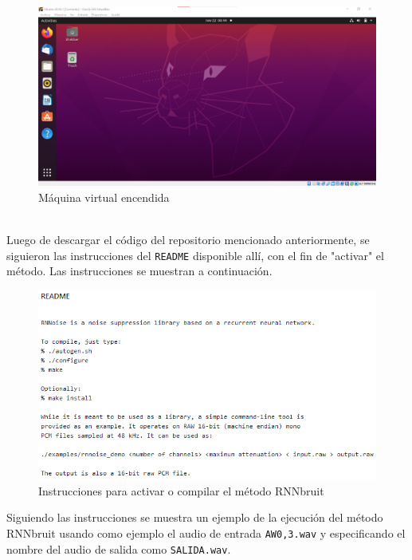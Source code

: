 \documentclass[conference,onecolumn]{IEEEtran}
\begin{document}
 \begin{figure}[H]
 \centering
    \includegraphics[scale=0.45]{VM2.png}
    \caption{Máquina virtual encendida} 
\end{figure}
\hfill\\
Luego de descargar el código del repositorio mencionado anteriormente, se siguieron las instrucciones del \texttt{README} disponible allí, con el fin de "activar" el método. Las instrucciones se muestran a continuación.

 \begin{figure}[H]
 \centering
    \includegraphics[scale=0.7]{VM3.png}
    \caption{Instrucciones para activar o compilar el método RNNbruit} 
\end{figure}

Siguiendo las instrucciones se muestra un ejemplo de la ejecución del método RNNbruit usando como ejemplo el audio de entrada \texttt{AW0,3.wav} y especificando el nombre del audio de salida como \texttt{SALIDA.wav}.
\end{document}
